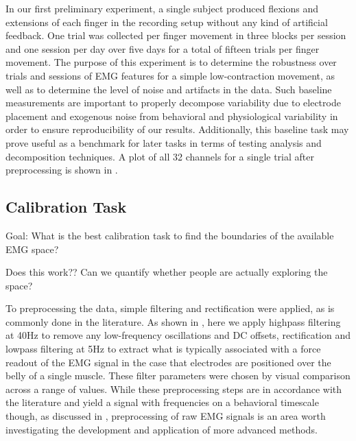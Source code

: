 \documentclass[../main.tex]{subfiles}
\begin{document}
In our first preliminary experiment, a single subject produced flexions and extensions of each finger in the recording setup without any kind of artificial feedback. One trial was collected per finger movement in three blocks per session and one session per day over five days for a total of fifteen trials per finger movement. The purpose of this experiment is to determine the robustness over trials and sessions of EMG features for a simple low-contraction movement, as well as to determine the level of noise and artifacts in the data. Such baseline measurements are important to properly decompose variability due to electrode placement and exogenous noise from behavioral and physiological variability in order to ensure reproducibility of our results. Additionally, this baseline task may prove useful as a benchmark for later tasks in terms of testing analysis and decomposition techniques. A plot of all 32 channels for a single trial after preprocessing is shown in .



\subsection{Calibration Task}

Goal: What is the best calibration task to find the boundaries of the available EMG space? 

Does this work?? Can we quantify whether people are actually exploring the space?

To preprocessing the data, simple filtering and rectification were applied, as is commonly done in the literature\cite{@sangerBayesianFilteringMyoelectric2007;@churchlandNeuralPopulationDynamics2012a;@churchlandNeuralVariabilityPremotor2006;@sussillo2015}. As shown in , here we apply highpass filtering at 40Hz to remove any low-frequency oscillations and DC offsets, rectification and lowpass filtering at 5Hz to extract what is typically associated with a force readout of the EMG signal in the case that electrodes are positioned over the belly of a single muscle. These filter parameters were chosen by visual comparison across a range of values. While these preprocessing steps are in accordance with the literature and yield a signal with frequencies on a behavioral timescale though, as discussed in , preprocessing of raw EMG signals is an area worth investigating the development and application of more advanced methods.
\end{document}
